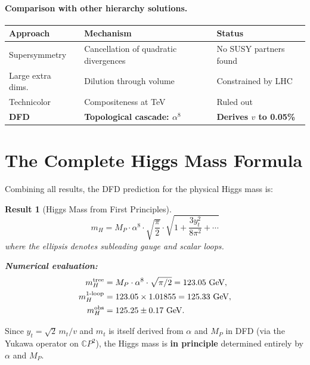 \documentclass[11pt]{article}
\newtheorem{result}{Result}
\theoremstyle{definition}
\begin{document}
\paragraph{Comparison with other hierarchy solutions.}
\begin{center}
\renewcommand{\arraystretch}{1.3}
\begin{tabular}{lll}
\toprule
Approach & Mechanism & Status \\
\midrule
Supersymmetry & Cancellation of quadratic divergences & No SUSY partners found \\
Large extra dims.\ & Dilution through volume & Constrained by LHC \\
Technicolor & Compositeness at TeV & Ruled out \\
\textbf{DFD} & \textbf{Topological cascade: $\alpha^8$} & \textbf{Derives $v$ to 0.05\%} \\
\bottomrule
\end{tabular}
\end{center}

\section{The Complete Higgs Mass Formula}
\label{sec:complete}

Combining all results, the DFD prediction for the physical Higgs mass is:

\begin{result}[Higgs Mass from First Principles]
\begin{equation}\label{eq:mH-complete}
\boxed{m_H = M_P \cdot \alpha^8 \cdot \sqrt{\frac{\pi}{2}}
\cdot \sqrt{1 + \frac{3 y_t^2}{8\pi^2} + \cdots}}
\end{equation}
where the ellipsis denotes subleading gauge and scalar loops.

\textbf{Numerical evaluation:}
\begin{align}
m_H^{\rm tree} &= M_P \cdot \alpha^8 \cdot \sqrt{\pi/2}
= 123.05~\text{GeV}, \\
m_H^{\rm 1\text{-}loop} &= 123.05 \times 1.01855
= 125.33~\text{GeV}, \\
m_H^{\rm obs} &= 125.25 \pm 0.17~\text{GeV}.
\end{align}
\end{result}

Since $y_t = \sqrt{2}\,m_t/v$ and $m_t$ is itself derived from
$\alpha$ and $M_P$ in DFD (via the Yukawa operator on $\mathbb{C}P^2$),
the Higgs mass is \textbf{in principle} determined entirely by $\alpha$
and $M_P$.
\end{document}
